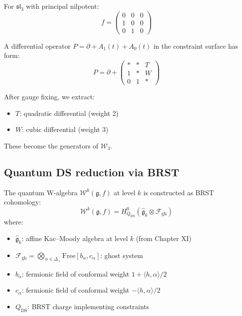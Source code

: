 \begin{example}
For $\mathfrak{sl}_3$ with principal nilpotent:
\begin{equation}
f = \begin{pmatrix} 0 & 0 & 0 \\ 1 & 0 & 0 \\ 0 & 1 & 0 \end{pmatrix}
\end{equation}

A differential operator $P = \partial + A_1(t) + A_0(t)$ in the constraint surface has form:
\begin{equation}
P = \partial + \begin{pmatrix} * & * & T \\ 1 & * & W \\ 0 & 1 & * \end{pmatrix}
\end{equation}

After gauge fixing, we extract:
\begin{itemize}
\item $T$: quadratic differential (weight 2)
\item $W$: cubic differential (weight 3)
\end{itemize}
These become the generators of $\mathcal{W}_3$.
\end{example}

\subsection{Quantum DS reduction via BRST}

\begin{definition}\label{def:quantum-ds}
The quantum W-algebra $\mathcal{W}^k(\mathfrak{g}, f)$ at level $k$ is constructed as BRST cohomology:
\begin{equation}
\mathcal{W}^k(\mathfrak{g}, f) = H^0_{Q_{\text{DS}}}\left(\widehat{\mathfrak{g}}_k \otimes \mathcal{F}_{\text{gh}}\right)
\end{equation}
where:
\begin{itemize}
\item $\widehat{\mathfrak{g}}_k$: affine Kac--Moody algebra at level $k$ (from Chapter XI)
\item $\mathcal{F}_{\text{gh}} = \bigotimes_{\alpha \in \Delta_+} \text{Free}[b_\alpha, c_\alpha]$: ghost system
\item $b_\alpha$: fermionic field of conformal weight $1 + \langle h, \alpha \rangle/2$
\item $c_\alpha$: fermionic field of conformal weight $-\langle h, \alpha \rangle/2$
\item $Q_{\text{DS}}$: BRST charge implementing constraints
\end{itemize}
\end{definition}


